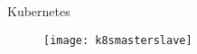 \begin{frame}{Kubernetes}

  \begin{figure}
    \centering
    \texttt{[image: k8smasterslave]}
  \end{figure}

\end{frame}